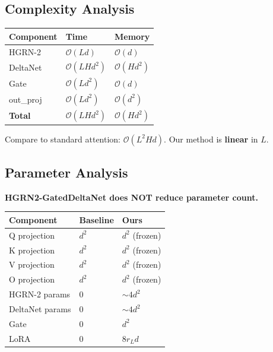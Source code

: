 \subsection{Complexity Analysis}

\begin{table}[H]
\centering
\small
\begin{tabular}{lll}
\toprule
\textbf{Component} & \textbf{Time} & \textbf{Memory} \\
\midrule
HGRN-2 & $\mathcal{O}(L d)$ & $\mathcal{O}(d)$ \\
DeltaNet & $\mathcal{O}(L H d^2)$ & $\mathcal{O}(H d^2)$ \\
Gate & $\mathcal{O}(L d^2)$ & $\mathcal{O}(d)$ \\
out\_proj & $\mathcal{O}(L d^2)$ & $\mathcal{O}(d^2)$ \\
\textbf{Total} & $\mathcal{O}(L H d^2)$ & $\mathcal{O}(H d^2)$ \\
\bottomrule
\end{tabular}
\end{table}

Compare to standard attention: $\mathcal{O}(L^2 H d)$. Our method is 
\textbf{linear} in $L$.

\subsection{Parameter Analysis}

\textbf{HGRN2-GatedDeltaNet does NOT reduce parameter count.}

\begin{table}[H]
\centering
\small
\begin{tabular}{lll}
\toprule
\textbf{Component} & \textbf{Baseline} & \textbf{Ours} \\
\midrule
Q projection & $d^2$ & $d^2$ (frozen) \\
K projection & $d^2$ & $d^2$ (frozen) \\
V projection & $d^2$ & $d^2$ (frozen) \\
O projection & $d^2$ & $d^2$ (frozen) \\
HGRN-2 params & 0 & $\sim 4d^2$ \\
DeltaNet params & 0 & $\sim 4d^2$ \\
Gate & 0 & $d^2$ \\
LoRA & 0 & $8 r_L d$ \\
\bottomrule
\end{tabular}
\end{table}

